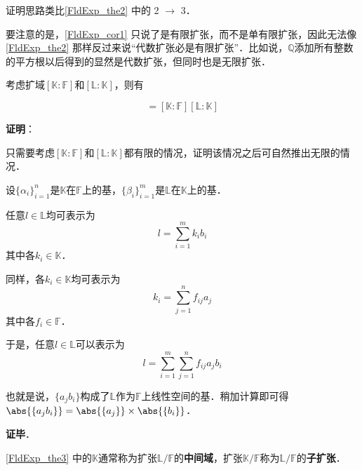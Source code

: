 证明思路类比\autoref{FldExp_the2} 中的 2 $\to$ 3．

要注意的是，\autoref{FldExp_cor1} 只说了是有限扩张，而不是单有限扩张，因此无法像\autoref{FldExp_the2} 那样反过来说“代数扩张必是有限扩张”．比如说，$\mathbb{Q}$添加所有整数的平方根以后得到的显然是代数扩张，但同时也是无限扩张．





\begin{theorem}{}\label{FldExp_the3}
考虑扩域$[\mathbb{K}:\mathbb{F}]$和$[\mathbb{L}:\mathbb{K}]$，则有

\begin{equation}
[\mathbb{L}:\mathbb{F}]=[\mathbb{K}:\mathbb{F}][\mathbb{L}:\mathbb{K}]
\end{equation}

\end{theorem}

\textbf{证明}：

只需要考虑$[\mathbb{K}:\mathbb{F}]$和$[\mathbb{L}:\mathbb{K}]$都有限的情况，证明该情况之后可自然推出无限的情况．

设$\{\alpha_i\}_{i=1}^{n}$是$\mathbb{K}$在$\mathbb{F}$上的基，$\{\beta_i\}_{i=1}^{m}$是$\mathbb{L}$在$\mathbb{K}$上的基．

任意$l\in\mathbb{L}$均可表示为
\begin{equation}
l = \sum_{i=1}^m k_ib_i
\end{equation}
其中各$k_i\in\mathbb{K}$．

同样，各$k_i\in\mathbb{K}$均可表示为
\begin{equation}
k_i = \sum_{j=1}^n f_{ij}a_j
\end{equation}
其中各$f_i\in\mathbb{F}$．

于是，任意$l\in\mathbb{L}$可以表示为
\begin{equation}
l = \sum_{i=1}^m \sum_{j=1}^n f_{ij}a_jb_i
\end{equation}

也就是说，$\{a_jb_i\}$构成了$\mathbb{L}$作为$\mathbb{F}$上线性空间的基．稍加计算即可得$\abs{\{a_jb_i\}}=\abs{\{a_j\}}\times\abs{\{b_i\}}$．





\textbf{证毕}．


\autoref{FldExp_the3} 中的$\mathbb{K}$通常称为扩张$\mathbb{L}/\mathbb{F}$的\textbf{中间域}，扩张$\mathbb{K}/\mathbb{F}$称为$\mathbb{L}/\mathbb{F}$的\textbf{子扩张}．






